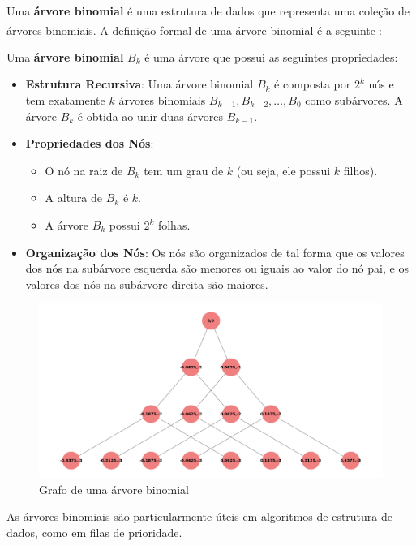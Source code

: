 \documentclass[12pt, a4paper]{scrreprt}
\begin{document}
Uma \textbf{árvore binomial} é uma estrutura de dados que representa uma coleção de árvores binomiais. A definição formal de uma árvore binomial é a seguinte\textsuperscript{\cite{definicaoarvorebinomialEllis} \cite{definicaoarvorebinomialTarjan}}:

Uma \textbf{árvore binomial} \( B_k \) é uma árvore que possui as seguintes propriedades:

\begin{itemize}
    \item \textbf{Estrutura Recursiva}: Uma árvore binomial \( B_k \) é composta por \( 2^k \) nós e tem exatamente \( k \) árvores binomiais \( B_{k-1}, B_{k-2}, \ldots, B_0 \) como subárvores. A árvore \( B_k \) é obtida ao unir duas árvores \( B_{k-1} \).
    
    \item \textbf{Propriedades dos Nós}: 
    \begin{itemize}
        \item O nó na raiz de \( B_k \) tem um grau de \( k \) (ou seja, ele possui \( k \) filhos).
        \item A altura de \( B_k \) é \( k \).
        \item A árvore \( B_k \) possui \( 2^k \) folhas.
    \end{itemize}
    
    \item \textbf{Organização dos Nós}: Os nós são organizados de tal forma que os valores dos nós na subárvore esquerda são menores ou iguais ao valor do nó pai, e os valores dos nós na subárvore direita são maiores.
\end{itemize}

\begin{figure}[h]
    \centering
    \includegraphics[width=.72\textwidth]{src/arvore_binomial_ordem_3.png}
    \caption{Grafo de uma árvore binomial}
    \label{fig:exemplo de árvore binomial}
\end{figure}

As árvores binomiais são particularmente úteis em algoritmos de estrutura de dados, como em filas de prioridade.
\end{document}
